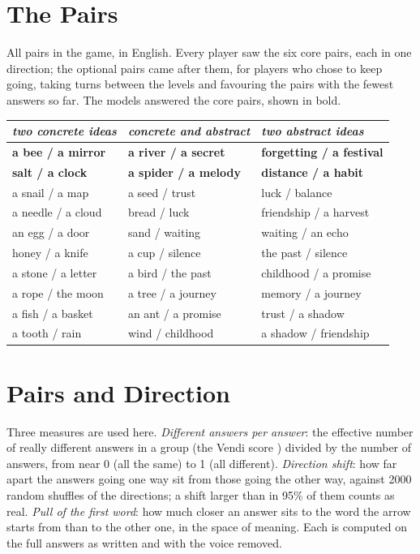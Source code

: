 \documentclass[11pt]{article}
\begin{document}
\section{The Pairs}
\label{app:pairs}

All pairs in the game, in English. Every player saw the six core pairs, each in one direction; the optional pairs came after them, for players who chose to keep going, taking turns between the levels and favouring the pairs with the fewest answers so far. The models answered the core pairs, shown in bold.

\begin{center}\footnotesize
\begin{tabular}{lll}
\toprule
\emph{two concrete ideas} & \emph{concrete and abstract} & \emph{two abstract ideas}\\
\midrule
\textbf{a bee / a mirror} & \textbf{a river / a secret} & \textbf{forgetting / a festival}\\
\textbf{salt / a clock} & \textbf{a spider / a melody} & \textbf{distance / a habit}\\
a snail / a map & a seed / trust & luck / balance\\
a needle / a cloud & bread / luck & friendship / a harvest\\
an egg / a door & sand / waiting & waiting / an echo\\
honey / a knife & a cup / silence & the past / silence\\
a stone / a letter & a bird / the past & childhood / a promise\\
a rope / the moon & a tree / a journey & memory / a journey\\
a fish / a basket & an ant / a promise & trust / a shadow\\
a tooth / rain & wind / childhood & a shadow / friendship\\
\bottomrule
\end{tabular}
\end{center}

\section{Pairs and Direction}
\label{app:pairsdir}

Three measures are used here. \emph{Different answers per answer}: the effective number of really different answers in a group (the Vendi score \citep{friedman2023}) divided by the number of answers, from near 0 (all the same) to 1 (all different). \emph{Direction shift}: how far apart the answers going one way sit from those going the other way, against 2000 random shuffles of the directions; a shift larger than in 95\% of them counts as real. \emph{Pull of the first word}: how much closer an answer sits to the word the arrow starts from than to the other one, in the space of meaning. Each is computed on the full answers as written and with the voice removed.
\end{document}
